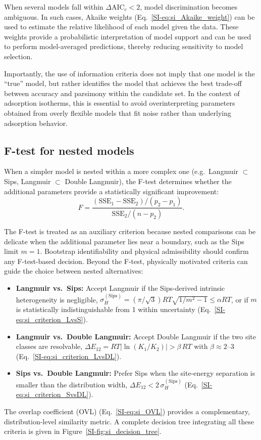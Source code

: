 \documentclass[journal=jacsat,manuscript=article]{achemso}
\begin{document}
When several models fall within $\Delta\mathrm{AIC}_c < 2$, model discrimination becomes ambiguous. In such cases, Akaike weights (Eq.~\ref{SI-eq:si_Akaike_weight}) can be used to estimate the relative likelihood of each model given the data. These weights provide a probabilistic interpretation of model support and can be used to perform model-averaged predictions, thereby reducing sensitivity to model selection.

Importantly, the use of information criteria does not imply that one model is the ``true'' model, but rather identifies the model that achieves the best trade-off between accuracy and parsimony within the candidate set. In the context of adsorption isotherms, this is essential to avoid overinterpreting parameters obtained from overly flexible models that fit noise rather than underlying adsorption behavior.


	\subsection{F-test for nested models}
	\label{sec:Ftest}

	When a simpler model is nested within a more complex one (e.g.\ Langmuir $\subset$ Sips, Langmuir $\subset$ Double Langmuir), the F-test determines whether the additional parameters provide a statistically significant improvement:
	\begin{equation}
		F = \frac{(\mathrm{SSE}_1 - \mathrm{SSE}_2)/(p_2 - p_1)}
		{\mathrm{SSE}_2 / (n - p_2)}.
		\label{eq:Ftest}
	\end{equation}

	The F-test is treated as an auxiliary criterion because nested comparisons can be delicate when the additional parameter lies near a boundary, such as the Sips limit $m=1$. Bootstrap identifiability and physical admissibility should confirm any F-test-based decision. Beyond the F-test, physically motivated criteria can guide the choice between nested alternatives:
	\begin{itemize}
		\item \textbf{Langmuir vs.\ Sips:} Accept Langmuir if the Sips-derived intrinsic heterogeneity is negligible, $\sigma_H^{\mathrm{(Sips)}}=(\pi/\sqrt{3})RT\sqrt{1/m^2-1}\leq \alpha RT$, or if $m$ is statistically indistinguishable from 1 within uncertainty (Eq.~\ref{SI-eq:si_criterion_LvsS}).
		\item \textbf{Langmuir vs.\ Double Langmuir:} Accept Double Langmuir if the two site classes are resolvable, $\Delta E_{12} = RT|\ln(K_1/K_2)| > \beta\,RT$ with $\beta \approx 2$--$3$ (Eq.~\ref{SI-eq:si_criterion_LvsDL}).
		\item \textbf{Sips vs.\ Double Langmuir:} Prefer Sips when the site-energy separation is smaller than the distribution width, $\Delta E_{12} < 2\,\sigma_H^{\mathrm{(Sips)}}$ (Eq.~\ref{SI-eq:si_criterion_SvsDL}).
	\end{itemize}
	The overlap coefficient (OVL) (Eq.~\ref{SI-eq:si_OVL}) provides a complementary, distribution-level similarity metric. A complete decision tree integrating all these criteria is given in Figure~\ref{SI-fig:si_decision_tree}.
\end{document}
